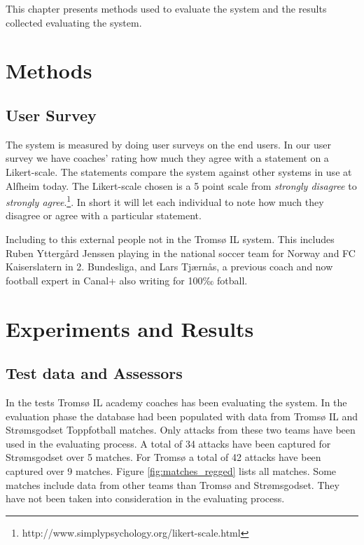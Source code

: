 This chapter presents methods used to evaluate the system and the results collected evaluating the system. 

\section{Methods}

\subsection{User Survey}

The system is measured by doing user surveys on the end users. In our user survey we have coaches’ rating how much they agree with a statement on a Likert-scale. The statements compare the system against other systems in use at Alfheim today. The Likert-scale chosen is a 5 point scale from \textit{strongly disagree} to \textit{strongly agree}.\footnote{http://www.simplypsychology.org/likert-scale.html}. In short it will let each individual to note how much they disagree or agree with a particular statement.

Including to this external people not in the Tromsø IL system. This includes Ruben Yttergård Jenssen playing in the national soccer team for Norway and FC Kaiserslatern in 2. Bundesliga, and Lars Tjærnås, a previous coach and now football expert in Canal+ also writing for 100‰ fotball.

\section{Experiments and Results}

\subsection{Test data and Assessors}

In the tests Tromsø IL academy coaches has been evaluating the system. In the evaluation phase the database had been populated with data from Tromsø IL and Strømsgodset Toppfotball matches. Only attacks from these two teams have been used in the evaluating process. A total of 34 attacks have been captured for Strømsgodset over 5 matches. For Tromsø a total of 42 attacks have been captured over 9 matches. Figure \ref{fig:matches_regged} lists all matches. Some matches include data from other teams than Tromsø and Strømsgodset. They have not been taken into consideration in the evaluating process.

